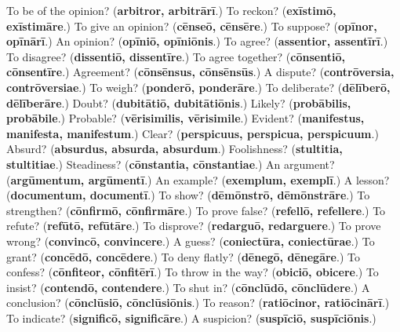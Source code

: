 \begin{tcolorbox}[breakable,colback=teal!4,colframe=teal!35!black,title={Before you move on}]
To be of the opinion? (\textbf{arbitror, arbitrārī}.) To reckon? (\textbf{exīstimō, exīstimāre}.) To give an opinion? (\textbf{cēnseō, cēnsēre}.) To suppose? (\textbf{opīnor, opīnārī}.) An opinion? (\textbf{opīniō, opīniōnis}.) To agree? (\textbf{assentior, assentīrī}.) To disagree? (\textbf{dissentiō, dissentīre}.) To agree together? (\textbf{cōnsentiō, cōnsentīre}.) Agreement? (\textbf{cōnsēnsus, cōnsēnsūs}.) A dispute? (\textbf{contrōversia, contrōversiae}.) To weigh? (\textbf{ponderō, ponderāre}.) To deliberate? (\textbf{dēlīberō, dēlīberāre}.) Doubt? (\textbf{dubitātiō, dubitātiōnis}.) Likely? (\textbf{probābilis, probābile}.) Probable? (\textbf{vērisimilis, vērisimile}.) Evident? (\textbf{manifestus, manifesta, manifestum}.) Clear? (\textbf{perspicuus, perspicua, perspicuum}.) Absurd? (\textbf{absurdus, absurda, absurdum}.) Foolishness? (\textbf{stultitia, stultitiae}.) Steadiness? (\textbf{cōnstantia, cōnstantiae}.) An argument? (\textbf{argūmentum, argūmentī}.) An example? (\textbf{exemplum, exemplī}.) A lesson? (\textbf{documentum, documentī}.) To show? (\textbf{dēmōnstrō, dēmōnstrāre}.) To strengthen? (\textbf{cōnfirmō, cōnfirmāre}.) To prove false? (\textbf{refellō, refellere}.) To refute? (\textbf{refūtō, refūtāre}.) To disprove? (\textbf{redarguō, redarguere}.) To prove wrong? (\textbf{convincō, convincere}.) A guess? (\textbf{coniectūra, coniectūrae}.) To grant? (\textbf{concēdō, concēdere}.) To deny flatly? (\textbf{dēnegō, dēnegāre}.) To confess? (\textbf{cōnfiteor, cōnfitērī}.) To throw in the way? (\textbf{obiciō, obicere}.) To insist? (\textbf{contendō, contendere}.) To shut in? (\textbf{cōnclūdō, cōnclūdere}.) A conclusion? (\textbf{cōnclūsiō, cōnclūsiōnis}.) To reason? (\textbf{ratiōcinor, ratiōcinārī}.) To indicate? (\textbf{significō, significāre}.) A suspicion? (\textbf{suspīciō, suspīciōnis}.)
\end{tcolorbox}
